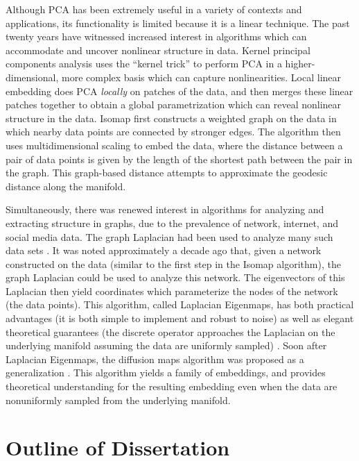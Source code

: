 Although PCA has been extremely useful in a variety of contexts and applications, its functionality is limited because it is a linear technique.
%
The past twenty years have witnessed increased interest in algorithms which can accommodate and uncover nonlinear structure in data.
%
Kernel principal components analysis \cite{scholkopf1997kernel} uses the ``kernel trick'' to perform PCA in a higher-dimensional, more complex basis which can capture nonlinearities.
%
Local linear embedding \cite{roweis2000nonlinear} does PCA {\em locally} on patches of the data, and then merges these linear patches together to obtain a global parametrization which can reveal nonlinear structure in the data.
%
Isomap \cite{tenenbaum2000global} first constructs a weighted graph on the data in which nearby data points are connected by stronger edges.
%
The algorithm then uses multidimensional scaling \cite{joseph1978multidimensional} to embed the data, where the distance between a pair of data points is given by the length of the shortest path between the pair in the graph.
%
This graph-based distance attempts to approximate the geodesic distance along the manifold.

Simultaneously, there was renewed interest in algorithms for analyzing and extracting structure in graphs, due to the prevalence of network, internet, and social media data.
%
The graph Laplacian had been used to analyze many such data sets \cite{shi2000normalized, ng2002spectral}.
%
It was noted approximately a decade ago that, given a network constructed on the data (similar to the first step in the Isomap algorithm), the graph Laplacian could be used to analyze this network.
%
The eigenvectors of this Laplacian then yield coordinates which parameterize the nodes of the network (the data points).
%
This algorithm, called Laplacian Eigenmaps, has both practical advantages (it is both simple to implement and robust to noise) as well as elegant theoretical guarantees (the discrete operator approaches the Laplacian on the underlying manifold assuming the data are uniformly sampled) \cite{Belkin2003}.
%
Soon after Laplacian Eigenmaps, the diffusion maps algorithm was proposed as a generalization \cite{coifman2005geometric, coifman2006geometric}.
%
This algorithm yields a family of embeddings, and provides theoretical understanding for the resulting embedding even when the data are nonuniformly sampled from the underlying manifold.


\section{Outline of Dissertation}

